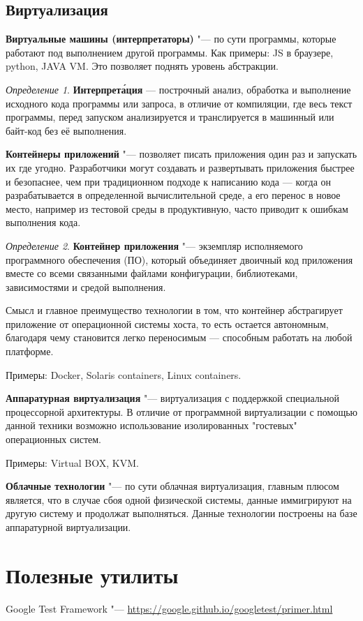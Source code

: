 \documentclass[bachelor, och, pract]{SCWorks}
\theoremstyle{remark}
\newtheorem{definition}{Определение}
\begin{document}
    \subsection{Виртуализация}

    \textbf{Виртуальные машины (интерпретаторы)} "--- по сути программы, которые работают под выполнением другой программы. Как примеры: JS в браузере, python, JAVA VM. Это позволяет поднять уровень абстракции.

    \begin{definition}
        \textbf{Интерпрета́ция} — построчный анализ, обработка и выполнение исходного кода программы или запроса, в отличие от компиляции, где весь текст программы, перед запуском анализируется и транслируется в машинный или байт-код без её выполнения.
    \end{definition}

    \textbf{Контейнеры приложений} "--- позволяет писать приложения один раз и запускать их где угодно. Разработчики могут создавать и развертывать приложения быстрее и безопаснее, чем при традиционном подходе к написанию кода — когда он разрабатывается в определенной вычислительной среде, а его перенос в новое место, например из тестовой среды в продуктивную, часто приводит к ошибкам выполнения кода.

    \begin{definition}
        \textbf{Контейнер приложения} "--- экземпляр исполняемого программного обеспечения (ПО), который объединяет двоичный код приложения вместе со всеми связанными файлами конфигурации, библиотеками, зависимостями и средой выполнения.
    \end{definition}

    Смысл и главное преимущество технологии в том, что контейнер абстрагирует приложение от операционной системы хоста, то есть остается автономным, благодаря чему становится легко переносимым — способным работать на любой платформе.

    Примеры: Docker, Solaris containers, Linux containers. 

    \textbf{Аппаратурная виртуализация} "--- виртуализация с поддержкой специальной процессорной архитектуры. В отличие от программной виртуализации с помощью данной техники возможно использование изолированных "гостевых" операционных систем.

    Примеры: Virtual BOX, KVM.


    \textbf{Облачные технологии} "--- по сути облачная виртуализация, главным плюсом является, что в случае сбоя одной физической системы, данные иммигрируют на другую систему и продолжат выполняться. Данные технологии построены на базе аппаратурной виртуализации.



    \section{Полезные утилиты}

    Google Test Framework "--- \href{https://google.github.io/googletest/primer.html}{https://google.github.io/googletest/primer.html}
\end{document}
